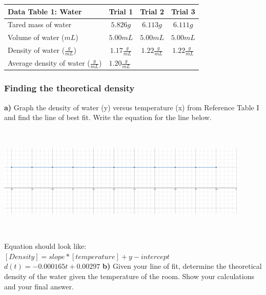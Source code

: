 \documentclass[a4paper,10pt]{article}
\begin{document}
    \begin{table}[h!]
    \label{tab:table1}
      \renewcommand{\arraystretch}{1.5}
      \begin{tabular}{|l|c|c|c|}
        \hline
        \textbf{Data Table 1: Water} & \textbf{Trial 1} & \textbf{Trial 2} & \textbf{Trial 3}\\
        \hline
        Tared mass of water & $5.826g$ & $6.113g$ & $6.111g$ \\
        \hline
        Volume of water ($mL$) & $5.00mL$ & $5.00mL$ & $5.00mL$ \\
        \hline
        Density of water ($\frac{g}{mL}$) & $1.17\frac{g}{mL}$ & $1.22\frac{g}{mL}$ & $1.22\frac{g}{mL}$\\
        \hline
        Average density of water ($\frac{g}{mL}$) & \multicolumn{2}{l}{$1.20\frac{g}{mL}$} & \\
        \hline
      \end{tabular}
    \end{table}

    \subsubsection*{Finding the theoretical density}
      \begin{flushleft}
        \textbf{a)} Graph the density of water (y) versus temperature (x) from Reference Table I and find the line of best fit. Write the equation for the line below.\\
        \vspace{5mm}
        \includegraphics[width= 12cm, height= 6cm]{graph.png}
        Equation should look like:\\
        \vspace{5mm}
        $[Density] = slope * [temperature] + y-intercept$\\
        \vspace{5mm}
        $d(t) = -0.000165t + 0.00297$
        \vspace{0.25in}
        \textbf{b)} Given your line of fit, determine the theoretical density of the water given the temperature of the room. Show your calculations and your final answer. 
      \end{flushleft}
\end{document}
